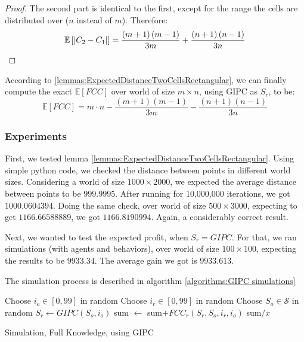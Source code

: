 \documentclass[a4paper,10pt]{article}
\newcommand\rob{\ensuremath{r}\xspace}
\newcommand\opp{\ensuremath{o}\xspace}
\newcommand{\fcc}{\ensuremath{FCC}\xspace}
\DeclarePairedDelimiter\abs{\lvert}{\rvert}%
\begin{document}
\begin{proof}
The second part is identical to the first, except for the range the cells are distributed over ($n$ instead of $m$). Therefore:
\[\mathbb{E}\left[\abs*{C_2-C_1}\right]=\frac{\left(m+1\right)\left(m-1\right)}{3m}+\frac{\left(n+1\right)\left(n-1\right)}{3n}\]

\end{proof}

According to \ref{lemmas:ExpectedDistanceTwoCellsRectangular}, we can finally compute the exact $\mathbb{E}[\fcc]$ over world of size $m\times n$, using GIPC as $S_{\rob}$, to be: \[\mathbb{E}\left[\fcc\right]=m\cdot n-\frac{\left(m+1\right)\left(m-1\right)}{3m}-\frac{\left(n+1\right)\left(n-1\right)}{3n}\]

\subsubsection{Experiments}
First, we tested lemma \ref{lemmas:ExpectedDistanceTwoCellsRectangular}. Using simple python code, we checked the distance between points in different world sizes. Considering a world of size $1000 \times 2000$, we expected the average distance between points to be $999.9995$. After running for 10,000,000 iterations, we got $1000.0604394$.
Doing the same check, over world of size $500\times 3000$, expecting to get $1166.66588889$, we got $1166.8190994$. Again, a considerably correct result.

Next, we wanted to test the expected profit, when $S_{\rob} = GIPC$. For that, we ran simulations (with agents and behaviors), over world of size $100 \times 100$, expecting the results to be $9933.34$.
The average gain we got is $9933.613$.

The simulation process is described in algorithm \ref{algorithms:GIPC simulations}
\begin{algorithm}
\begin{algorithmic}
    	\STATE Choose $i_{\opp}\in \left[0,99\right]$ in random
        \STATE Choose $i_{\rob}\in \left[0,99\right]$ in random
        \STATE Choose $S_{\opp}\in \mathcal{S}$ in random
        \STATE $S_{\rob} \leftarrow GIPC\left(S_{\opp}, i_{\opp}\right)$
    	\STATE sum $\leftarrow $ sum$+ {\fcc}_{\rob}(S_{\rob},S_{\opp}, i_{\rob}, i_{\opp})$
    \ENDFOR
    \RETURN sum$/x$
  
\end{algorithmic}
\caption{Simulation, Full Knowledge, using GIPC\label{algorithms:GIPC simulations}}
\end{algorithm}
\end{document}
